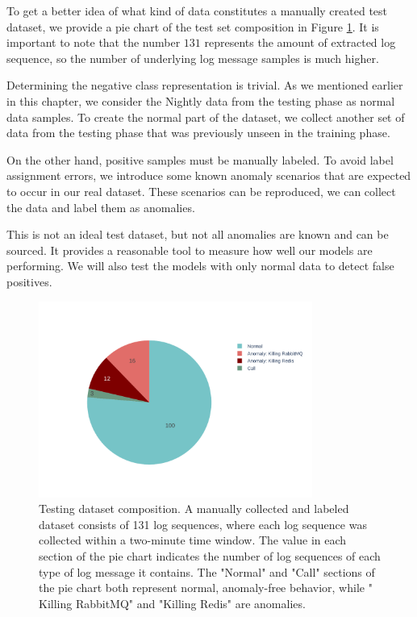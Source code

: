 To get a better idea of what kind of data constitutes a manually created test dataset, we provide a pie chart of the test set composition in Figure \ref{fig:testset-composition}. It is important to note that the number $131$ represents the amount of extracted log sequence, so the number of underlying log message samples is much higher.

Determining the negative class representation is trivial. As we mentioned earlier in this chapter, we consider the Nightly data from the testing phase as normal data samples. To create the normal part of the dataset, we collect another set of data from the testing phase that was previously unseen in the training phase. 

On the other hand, positive samples must be manually labeled. To avoid label assignment errors, we introduce some known anomaly scenarios that are expected to occur in our real dataset. These scenarios can be reproduced, we can collect the data and label them as anomalies. 

This is not an ideal test dataset, but not all anomalies are known and can be sourced. It provides a reasonable tool to measure how well our models are performing. We will also test the models with only normal data to detect false positives. 

\begin{figure}[h]
    \centering
    \includegraphics[width=0.8\textwidth]{img/testset-composition.pdf}
    \caption{Testing dataset composition. A manually collected and labeled dataset consists of 131 log sequences, where each log sequence was collected within a two-minute time window. The value in each section of the pie chart indicates the number of log sequences of each type of log message it contains. The "Normal" and "Call" sections of the pie chart both represent normal, anomaly-free behavior, while " Killing RabbitMQ" and "Killing Redis" are anomalies.}
    \label{fig:testset-composition}
\end{figure}

